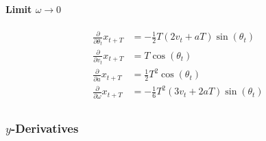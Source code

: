 \documentclass{article}
\begin{document}
\paragraph{Limit $\omega \to 0$}
\begin{align*}
    \frac{\partial}{\partial \theta_t} x_{t+T} &=
    -\frac{1}{2}T(2v_t + aT)\sin(\theta_t)
    \\
    \frac{\partial}{\partial v_t} x_{t+T} &=
    T\cos(\theta_t)
    \\
    \frac{\partial}{\partial a} x_{t+T} &=
    \frac{1}{2}T^2\cos(\theta_t)
    \\
    \frac{\partial}{\partial \omega} x_{t+T} &=
    -\frac{1}{6}T^2(3v_t + 2aT)\sin(\theta_t)
    \\
\end{align*}
\subsubsection{$y$-Derivatives}
\end{document}
